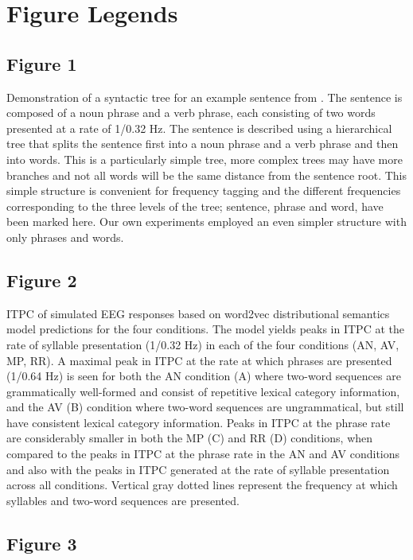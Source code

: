 \documentclass[10pt,letterpaper]{article}
\begin{document}
\section*{Figure Legends}

\subsection*{Figure 1}

Demonstration of a syntactic tree for an example sentence from \cite{DingEtAl2016, DingEtAl2017}. The sentence is composed of a noun phrase and a verb phrase, each consisting of two words presented at a rate of 1/0.32 Hz.  The sentence is described using a hierarchical tree that splits the sentence first into a noun phrase and a verb phrase and then into words. This is a particularly simple tree, more complex trees may have more branches and not all words will be the same distance from the sentence root. This simple structure is convenient for frequency tagging and the different frequencies corresponding to the three levels of the tree; sentence, phrase and word, have been marked here. Our own experiments employed an even simpler structure with only phrases and words.

\subsection*{Figure 2}
ITPC of simulated EEG responses based on word2vec distributional semantics model predictions for the four conditions. The model yields peaks in ITPC at the rate of syllable presentation (1/0.32 Hz) in each of the four conditions (AN, AV, MP, RR). A maximal peak in ITPC at the rate at which phrases are presented (1/0.64 Hz) is seen for both the AN condition (A) where two-word sequences are grammatically well-formed and consist of repetitive lexical category information, and the AV (B) condition where two-word sequences are ungrammatical, but still have consistent lexical category information. Peaks in ITPC at the phrase rate are considerably smaller in both the MP (C) and RR (D) conditions, when compared to the peaks in ITPC at the phrase rate in the AN and AV conditions and also with the peaks in ITPC generated at the rate of syllable presentation across all conditions. Vertical gray dotted lines represent the frequency at which syllables and two-word sequences are presented.

\subsection*{Figure 3}
\end{document}
